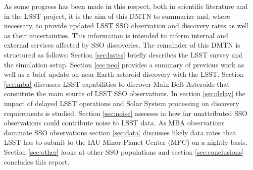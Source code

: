 As some progress has been made in this respect, both in scientific literature and in the \gls{LSST} project, it is the aim of this \gls{DMTN} to summarize and, where necessary, to provide updated \gls{LSST} \gls{SSO} observation and discovery rates as well as their uncertainties. This information is intended to inform internal and external services affected by \gls{SSO} discoveries.
The remainder of this \gls{DMTN} is structured as follows: Section \ref{sec:lsstss} briefly describes the \gls{LSST} survey and the simulation setup. Section \ref{sec:neo} provides a summary of previous work as well as a brief update on near-Earth asteroid discovery with the \gls{LSST}. Section \ref{sec:mba} discusses \gls{LSST} capabilities to discover Main Belt Asteroids that constitute the main source of \gls{LSST} \gls{SSO} observations. In section \ref{sec:delay} the impact of delayed \gls{LSST} operations and Solar System processing on discovery requirements is studied. Section \ref{sec:noise} assesses in how far unattributed \gls{SSO} observations could contribute noise to \gls{LSST} data. As \gls{MBA} observations dominate \gls{SSO} observations section \ref{sec:data} discusses likely data rates that \gls{LSST} has to submit to the \gls{IAU} Minor Planet \gls{Center} (\gls{MPC}) on a nightly basis. Section \ref{sec:other}  looks at other \gls{SSO} populations and section \ref{sec:conclusions} concludes this report.

